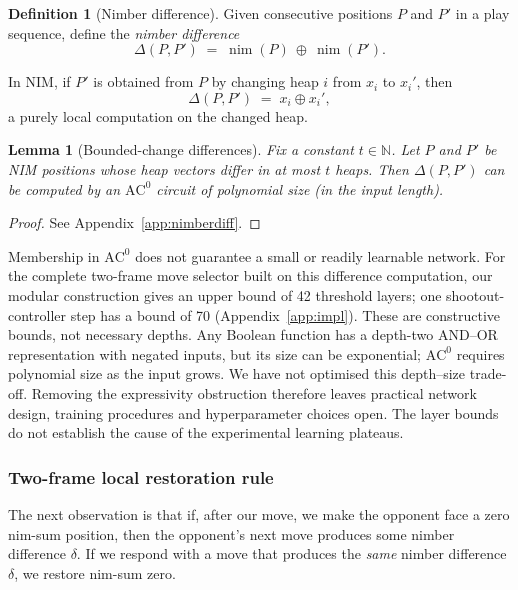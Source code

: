 \documentclass[11pt]{article}
\newcommand{\AC}{\mathrm{AC}}
\newcommand{\N}{\mathbb{N}}
\theoremstyle{plain}
\newtheorem{lemma}[theorem]{Lemma}
\theoremstyle{definition}
\newtheorem{definition}[theorem]{Definition}
\theoremstyle{remark}
\numberwithin{equation}{section}
\begin{document}
\begin{definition}[Nimber difference]
\label{def:nimber-difference}
Given consecutive positions $P$ and $P'$ in a play sequence, define the \emph{nimber difference}
\[
\Delta(P,P') \;=\; \operatorname{nim}(P)\ \oplus\ \operatorname{nim}(P').
\]
\end{definition}

In NIM, if $P'$ is obtained from $P$ by changing heap $i$ from $x_i$ to $x_i'$, then
\[
\Delta(P,P') \;=\; x_i \oplus x_i',
\]
a purely local computation on the changed heap.

\begin{lemma}[Bounded-change differences]
\label{lem:nimber-diff-ac0}
Fix a constant $t\in\N$.
Let $P$ and $P'$ be NIM positions whose heap vectors differ in at most $t$ heaps.
Then $\Delta(P,P')$ can be computed by an $\AC^0$ circuit of polynomial size (in the input length).
\end{lemma}

\begin{proof}
See Appendix~\ref{app:nimberdiff}.
\end{proof}

Membership in $\AC^0$ does not guarantee a small or readily learnable network. For the complete two-frame move selector built on this difference computation, our modular construction gives an upper bound of 42 threshold layers; one shootout-controller step has a bound of 70 (Appendix~\ref{app:impl}). These are constructive bounds, not necessary depths. Any Boolean function has a depth-two AND--OR representation with negated inputs, but its size can be exponential; $\AC^0$ requires polynomial size as the input grows. We have not optimised this depth--size trade-off. Removing the expressivity obstruction therefore leaves practical network design, training procedures and hyperparameter choices open. The layer bounds do not establish the cause of the experimental learning plateaus.

\subsubsection{Two-frame local restoration rule}
\label{sec:restoration}

The next observation is that if, after our move, we make the opponent face a zero nim-sum position, then the opponent's next move produces some nimber difference $\delta$. If we respond with a move that produces the \emph{same} nimber difference $\delta$, we restore nim-sum zero.
\end{document}

